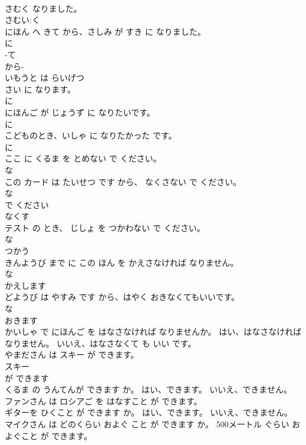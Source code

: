 \documentclass[8pt]{extreport}
\begin{document}
\begin{CJK}{UTF8}{min}
\\	さむく なりました。	
\\	さむい:く 
\\	にほん へ きて から、さしみ が すき に なりました。	
\\	に 
\\	-て 
\\	から- 
\\	いもうと は らいげつ 
\\	さい に なります。	
\\	に 
\\	にほんご が じょうず に なりたいです。	
\\	に 
\\	こどものとき、いしゃ に なりたかった です。	
\\	に 
\\	ここ に くるま を とめない で ください。	
\\	な 
\\	この カード は たいせつ です から、 なくさない で ください。	
\\	な 
\\	で ください 
\\	なくす
\\	テスト の とき、 じしょ を つかわない で ください。	
\\	な 
\\	つかう
\\	きんようび まで に この ほん を かえさなければ なりません。	
\\	な 
\\	かえします
\\	どようび は やすみ です から、はやく おきなくてもいいです。	
\\	な 
\\	おきます 
\\	かいしゃ で にほんご を はなさなければ なりませんか。 はい、はなさなければ なりません。 いいえ、はなさなくて も いい です。	
\\	やまださん は スキー が できます。	
\\	スキー 
\\	が できます
\\	くるま の うんてんが できます か。 はい、できます。 いいえ、できません。	
\\	ファンさん は ロシアご を はなすこと が できます。	
\\	ギターを ひくこと が できます か。 はい、できます。 いいえ、できません。	
\\	マイクさん は どのくらい およぐ こと が できます か。 500メ一トル ぐらい およぐこと が できます。	

\end{CJK}
\end{document}
